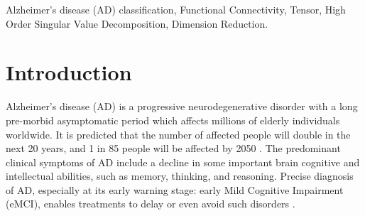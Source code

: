\documentclass[journal]{IEEEtran}
\begin{document}
	
	
	\begin{IEEEkeywords}
		Alzheimer’s disease (AD) classification, Functional Connectivity, Tensor, High Order Singular Value Decomposition, Dimension Reduction.
	\end{IEEEkeywords}
	
	
	
	
	
	
	\IEEEpeerreviewmaketitle
	
	
	
	\section{Introduction}
	 \label{Intro}
	Alzheimer’s disease (AD) is a progressive neurodegenerative disorder with a long pre-morbid asymptomatic period which affects millions of elderly individuals worldwide\cite{r01}. It is predicted that the number of affected people will double in the next 20 years, and 1 in 85 people will be affected by 2050 \cite{r02}. The predominant clinical symptoms of AD include a decline in some important brain cognitive and intellectual abilities, such as memory, thinking, and reasoning. Precise diagnosis of AD, especially at its early warning stage: early Mild Cognitive Impairment (eMCI), enables treatments to delay or even avoid such disorders \cite{r03}.
	
	
	
\end{document}
